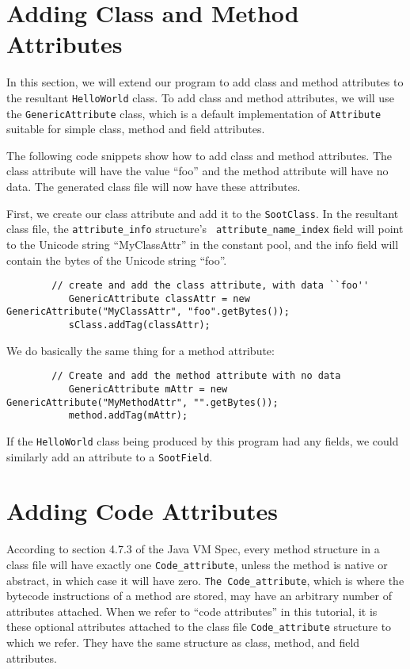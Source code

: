 \documentclass{article}
\begin{document}
\section{Adding Class and Method Attributes}

In this section, we will extend our program to add class and method attributes 
to the resultant {\tt HelloWorld} class. To add class and method attributes, 
we will use the {\tt GenericAttribute} class, which is a default 
implementation of {\tt Attribute} suitable for simple class, method and field 
attributes.

The following code snippets show how to add class and method attributes. The 
class attribute will have the value ``foo'' and the method attribute will have 
no data. The generated class file will now have these attributes.

First, we create our class attribute and add it to the {\tt SootClass}. In the 
resultant class file, the {\tt attribute\_info} structure's {\tt 
attribute\_name\_index} field will point to the Unicode string ``MyClassAttr'' 
in the constant pool, and the info field will contain the bytes of the Unicode 
string ``foo''.

\begin{verbatim}
        // create and add the class attribute, with data ``foo''
           GenericAttribute classAttr = new GenericAttribute("MyClassAttr", "foo".getBytes());
           sClass.addTag(classAttr);
\end{verbatim}

We do basically the same thing for a method attribute:

\begin{verbatim}
        // Create and add the method attribute with no data
           GenericAttribute mAttr = new GenericAttribute("MyMethodAttr", "".getBytes());
           method.addTag(mAttr);
\end{verbatim}

If the {\tt HelloWorld} class being produced by this program had any fields, 
we could similarly add an attribute to a {\tt SootField}.

\section{Adding Code Attributes}

According to section 4.7.3 of the Java VM Spec, every method structure in a 
class file will have exactly one {\tt Code\_attribute}, unless the method is 
native or abstract, in which case it will have zero. {\tt The 
Code\_attribute}, which is where the bytecode instructions of a method are 
stored, may have an arbitrary number of attributes attached. When we refer to 
``code attributes'' in this tutorial, it is these optional attributes attached 
to the class file {\tt Code\_attribute} structure to which we refer. They have 
the same structure as class, method, and field attributes.
\end{document}
